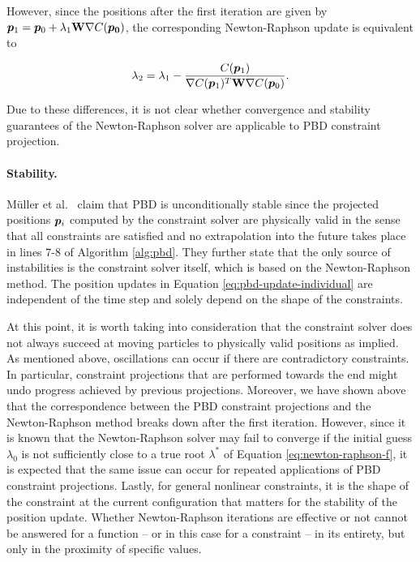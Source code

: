 \noindent However, since the positions after the first iteration are given by $\bm{p}_1 = \bm{p}_0 + \lambda_1 \mathbf{W} \nabla C(\bm{p_0})$, 
the corresponding Newton-Raphson update is equivalent to 

\[
    \lambda_2 = \lambda_1 - \frac{C(\bm{p}_1)}{\nabla C(\bm{p}_1)^T \mathbf{W} \nabla C(\bm{p}_0)}.
\]

\noindent Due to these differences, it is not clear whether convergence and stability guarantees of the Newton-Raphson solver are applicable to 
PBD constraint projection.

\paragraph{Stability.}
Müller et al.\ \cite{mueller2006} claim that PBD is unconditionally stable since the projected positions $\bm{p}_i$ computed by the constraint 
solver are physically valid in the sense that all constraints are satisfied and no extrapolation into the future takes place in lines 7-8 of
Algorithm \ref{alg:pbd}. They further state that the only source of instabilities is the constraint solver itself, which is based on the 
Newton-Raphson method. The position updates in Equation \ref{eq:pbd-update-individual} are independent of the time step and solely depend on the 
shape of the constraints. 

At this point, it is worth taking into consideration that the constraint solver does not always succeed at moving 
particles to physically valid positions as implied. As mentioned above, oscillations can occur if there are contradictory constraints. 
In particular, constraint projections that are performed towards the end might undo progress achieved by previous projections. 
Moreover, we have shown above that the correspondence between the PBD constraint projections and the Newton-Raphson method breaks down 
after the first iteration. However, since it is known that the Newton-Raphson solver may fail to converge if the initial guess $\lambda_0$
is not sufficiently close to a true root $\lambda^*$ of Equation \ref{eq:newton-raphson-f}, it is expected that the same issue can occur for 
repeated applications of PBD constraint projections. Lastly, for general nonlinear constraints, it is the shape of the constraint at the 
current configuration that matters for the stability of the position update. Whether Newton-Raphson iterations are effective or not cannot be 
answered for a function -- or in this case for a constraint -- in its entirety, but only in the proximity of specific values.

